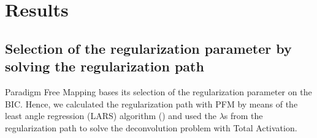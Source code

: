 
\section{Results}


\subsection{Selection of the regularization parameter by solving the regularization path}
\label{sec:regpath}

Paradigm Free Mapping bases its selection of the regularization parameter on the BIC. Hence, we calculated the regularization path with PFM by means of the least angle regression (LARS) algorithm (\citealt{efron2004LeastAngleRegression}) and used the \(\lambda\)s from the regularization path to solve the deconvolution problem with Total Activation.

